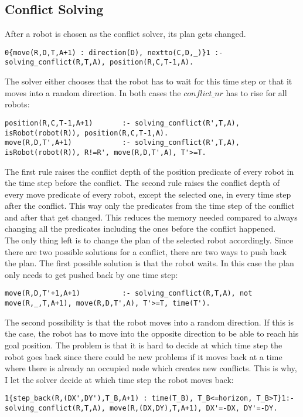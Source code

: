 \documentclass[runningheads]{llncs}
\begin{document}
\subsection{Conflict Solving}
After a robot is chosen as the conflict solver, its plan gets changed. 
\begin{verbatim}
0{move(R,D,T,A+1) : direction(D), nextto(C,D,_)}1 :- solving_conflict(R,T,A), position(R,C,T-1,A).
\end{verbatim}
The solver either chooses that the robot has to wait for this time step or that it moves into a random direction.
In both cases the $conflict\_nr$ has to rise for all robots:
\begin{verbatim}
position(R,C,T-1,A+1) 		:- solving_conflict(R',T,A), isRobot(robot(R)), position(R,C,T-1,A).
move(R,D,T',A+1) 			:- solving_conflict(R',T,A), isRobot(robot(R)), R!=R', move(R,D,T',A), T'>=T.
\end{verbatim}
The first rule raises the conflict depth of the position predicate of every robot in the time step before the conflict. The second rule raises the conflict depth of every move predicate of every robot, except the selected one, in every time step after the conflict. This way only the predicates from the time step of the conflict and after that get changed. This reduces the memory needed compared to always changing all the predicates including the ones before the conflict happened. \\
The only thing left is to change the plan of the selected robot accordingly. Since there are two possible solutions for a conflict, there are two ways to push back the plan. The first possible solution is that the robot waits. In this case the plan only needs to get pushed back by one time step:
\begin{verbatim}
move(R,D,T'+1,A+1) 			:- solving_conflict(R,T,A), not move(R,_,T,A+1), move(R,D,T',A), T'>=T, time(T').
\end{verbatim}
The second possibility is that the robot moves into a random direction. If this is the case, the robot has to move into the opposite direction to be able to reach his goal position. The problem is that it is hard to decide at which time step the robot goes back since there could be new problems if it moves back at a time where there is already an occupied node which creates new conflicts. This is why, I let the solver decide at which time step the robot moves back:
\begin{verbatim}
1{step_back(R,(DX',DY'),T_B,A+1) : time(T_B), T_B<=horizon, T_B>T}1:- solving_conflict(R,T,A), move(R,(DX,DY),T,A+1), DX'=-DX, DY'=-DY.
\end{verbatim}
\end{document}
